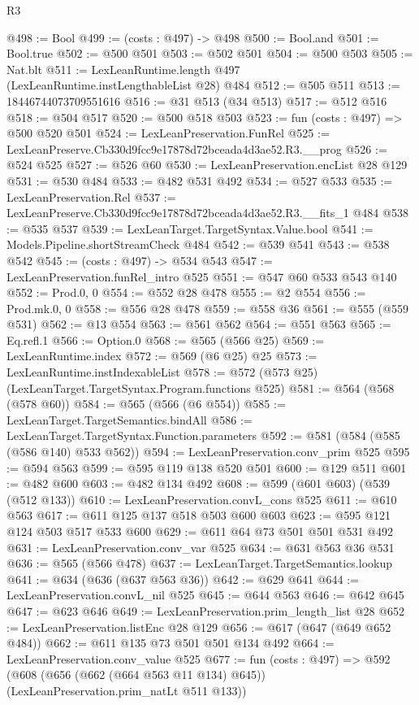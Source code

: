 \begin{lexlean}{R3}
\begin{coremodule}
@498 := Bool
@499 := (costs : @497) -> @498
@500 := Bool.and
@501 := Bool.true
@502 := @500 @501
@503 := @502 @501
@504 := @500 @503
@505 := Nat.blt
@511 := LexLeanRuntime.length @497 (LexLeanRuntime.instLengthableList @28) @484
@512 := @505 @511
@513 := 18446744073709551616
@516 := @31 @513 (@34 @513)
@517 := @512 @516
@518 := @504 @517
@520 := @500 @518 @503
@523 := fun (costs : @497) => @500 @520 @501
@524 := LexLeanPreservation.FunRel
@525 := LexLeanPreserve.Cb330d9fcc9e17878d72bceada4d3ae52.R3.__prog
@526 := @524 @525
@527 := @526 @60
@530 := LexLeanPreservation.encList @28 @129
@531 := @530 @484
@533 := @482 @531 @492
@534 := @527 @533
@535 := LexLeanPreservation.Rel
@537 := LexLeanPreserve.Cb330d9fcc9e17878d72bceada4d3ae52.R3.__fits_1 @484
@538 := @535 @537
@539 := LexLeanTarget.TargetSyntax.Value.bool
@541 := Models.Pipeline.shortStreamCheck @484
@542 := @539 @541
@543 := @538 @542
@545 := (costs : @497) -> @534 @543
@547 := LexLeanPreservation.funRel_intro @525
@551 := @547 @60 @533 @543 @140
@552 := Prod.{0, 0}
@554 := @552 @28 @478
@555 := @2 @554
@556 := Prod.mk.{0, 0}
@558 := @556 @28 @478
@559 := @558 @36
@561 := @555 (@559 @531)
@562 := @13 @554
@563 := @561 @562
@564 := @551 @563
@565 := Eq.refl.{1}
@566 := Option.{0}
@568 := @565 (@566 @25)
@569 := LexLeanRuntime.index
@572 := @569 (@6 @25) @25
@573 := LexLeanRuntime.instIndexableList
@578 := @572 (@573 @25) (LexLeanTarget.TargetSyntax.Program.functions @525)
@581 := @564 (@568 (@578 @60))
@584 := @565 (@566 (@6 @554))
@585 := LexLeanTarget.TargetSemantics.bindAll
@586 := LexLeanTarget.TargetSyntax.Function.parameters
@592 := @581 (@584 (@585 (@586 @140) @533 @562))
@594 := LexLeanPreservation.conv_prim @525
@595 := @594 @563
@599 := @595 @119 @138 @520 @501
@600 := @129 @511
@601 := @482 @600
@603 := @482 @134 @492
@608 := @599 (@601 @603) (@539 (@512 @133))
@610 := LexLeanPreservation.convL_cons @525
@611 := @610 @563
@617 := @611 @125 @137 @518 @503 @600 @603
@623 := @595 @121 @124 @503 @517 @533 @600
@629 := @611 @64 @73 @501 @501 @531 @492
@631 := LexLeanPreservation.conv_var @525
@634 := @631 @563 @36 @531
@636 := @565 (@566 @478)
@637 := LexLeanTarget.TargetSemantics.lookup
@641 := @634 (@636 (@637 @563 @36))
@642 := @629 @641
@644 := LexLeanPreservation.convL_nil @525
@645 := @644 @563
@646 := @642 @645
@647 := @623 @646
@649 := LexLeanPreservation.prim_length_list @28
@652 := LexLeanPreservation.listEnc @28 @129
@656 := @617 (@647 (@649 @652 @484))
@662 := @611 @135 @73 @501 @501 @134 @492
@664 := LexLeanPreservation.conv_value @525
@677 := fun (costs : @497) =>
  @592 (@608 (@656 (@662 (@664 @563 @11 @134) @645)) (LexLeanPreservation.prim_natLt @511 @133))

\end{coremodule}
\end{lexlean}
